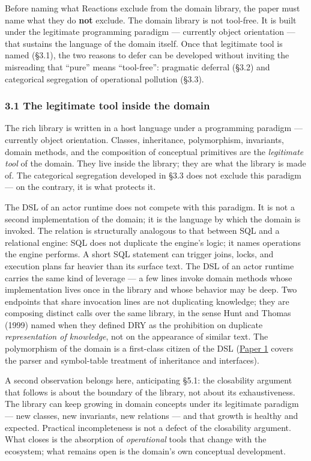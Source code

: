 \documentclass[
]{article}
\begin{document}
Before naming what Reactions exclude from the domain library, the paper
must name what they do \textbf{not} exclude. The domain library is not
tool-free. It is built under the legitimate programming paradigm ---
currently object orientation --- that sustains the language of the
domain itself. Once that legitimate tool is named (§3.1), the two
reasons to defer can be developed without inviting the misreading that
``pure'' means ``tool-free'': pragmatic deferral (§3.2) and categorical
segregation of operational pollution (§3.3).

\subsubsection{3.1 The legitimate tool inside the
domain}\label{the-legitimate-tool-inside-the-domain}

The rich library is written in a host language under a programming
paradigm --- currently object orientation. Classes, inheritance,
polymorphism, invariants, domain methods, and the composition of
conceptual primitives are the \emph{legitimate tool} of the domain. They
live inside the library; they are what the library is made of. The
categorical segregation developed in §3.3 does not exclude this paradigm
--- on the contrary, it is what protects it.

The DSL of an actor runtime does not compete with this paradigm. It is
not a second implementation of the domain; it is the language by which
the domain is invoked. The relation is structurally analogous to that
between SQL and a relational engine: SQL does not duplicate the engine's
logic; it names operations the engine performs. A short SQL statement
can trigger joins, locks, and execution plans far heavier than its
surface text. The DSL of an actor runtime carries the same kind of
leverage --- a few lines invoke domain methods whose implementation
lives once in the library and whose behavior may be deep. Two endpoints
that share invocation lines are not duplicating knowledge; they are
composing distinct calls over the same library, in the sense Hunt and
Thomas (1999) named when they defined DRY as the prohibition on
duplicate \emph{representation of knowledge}, not on the appearance of
similar text. The polymorphism of the domain is a first-class citizen of
the DSL (\href{01-anti-porosity.md}{Paper 1} covers the parser and
symbol-table treatment of inheritance and interfaces).

A second observation belongs here, anticipating §5.1: the closability
argument that follows is about the boundary of the library, not about
its exhaustiveness. The library can keep growing in domain concepts
under its legitimate paradigm --- new classes, new invariants, new
relations --- and that growth is healthy and expected. Practical
incompleteness is not a defect of the closability argument. What closes
is the absorption of \emph{operational} tools that change with the
ecosystem; what remains open is the domain's own conceptual development.
\end{document}
